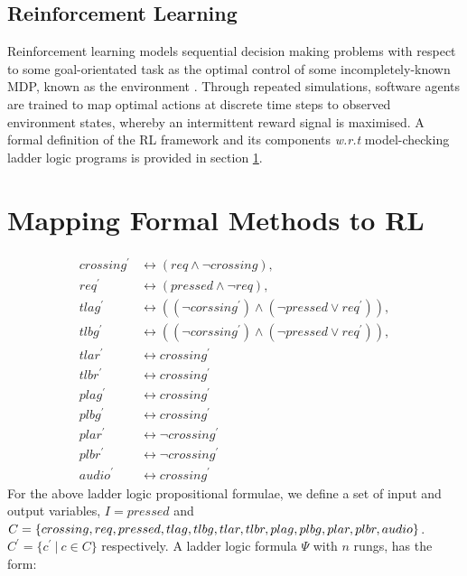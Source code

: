 \documentclass[runningheads]{llncs}
\begin{document}
\subsection{Reinforcement Learning}

Reinforcement learning models sequential decision making problems with respect to some goal-orientated task as the optimal control of some incompletely-known MDP, known as the environment \cite{sutton2018reinforcement}. Through repeated simulations, software agents are trained to map optimal actions at discrete time steps to observed environment states, whereby an intermittent reward signal is maximised. A formal definition of the RL framework and its components \textit{w.r.t} model-checking ladder logic programs is provided in section \ref{sec:mapping_fm_to_ml}. 


\section{Mapping Formal Methods to RL} \label{sec:mapping_fm_to_ml}

\begin{align}
	crossing^\prime & \leftrightarrow (req \land \lnot crossing), \\
	req^\prime & \leftrightarrow (pressed \land \lnot req), \\
	tlag^\prime & \leftrightarrow ((\lnot corssing^\prime) \land (\lnot pressed \lor req^\prime)), \\
	tlbg ^\prime & \leftrightarrow ((\lnot corssing^\prime) \land (\lnot pressed \lor req^\prime)), \\
	tlar^\prime & \leftrightarrow crossing^\prime \\
	tlbr^\prime & \leftrightarrow crossing^\prime \\
	plag^\prime & \leftrightarrow crossing^\prime \\
	plbg^\prime & \leftrightarrow crossing^\prime \\
	plar^\prime & \leftrightarrow \lnot crossing^\prime \\
	plbr^\prime & \leftrightarrow \lnot crossing^\prime \\ 
	audio^\prime & \leftrightarrow crossing^\prime
\end{align}
For the above ladder logic propositional formulae, we define a set of input and output variables, $I = {pressed}$ and
$C = \{crossing, req, pressed, tlag, tlbg, tlar, \\ tlbr, plag, plbg, plar, plbr, audio\}$. $C^\prime = \{c^\prime \ | \ c \in C \}$ respectively. A ladder logic formula $\Psi$ with $n$ rungs, has the form:
\end{document}
